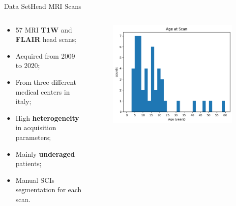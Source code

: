 \documentclass[]{standalone}
\begin{document}
	\begin{frame}{Data Set}{Head MRI Scans}
	\vspace{-25pt}
	\begin{columns}
		\begin{column}{0.5\textwidth}
		\begin{exampleblock}{}
		\begin{itemize}
		\small
			\item 57 MRI \textbf{T1W} and \textbf{FLAIR} head scans;
			\item Acquired from 2009 to 2020;
			\item From three different medical centers in italy;
			\item High \textbf{heterogeneity} in acquisition parameters;
			\item Mainly \textbf{underaged} patients;
			\item Manual SCIs segmentation for each scan.
		\end{itemize}
		\end{exampleblock}
		\end{column}
		\begin{column}{0.52\textwidth}
		\vspace{-5pt}
		\begin{figure}[h!]
			\centering
			\includegraphics[scale = 0.29]{./IMG/Age.png}
		\end{figure}
		\vspace{-15pt}
		\begin{figure}[h!]
			\centering

\end{figure}
\end{column}
\end{columns}
\end{frame}
\end{document}

